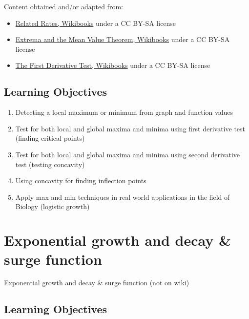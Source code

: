 Content obtained and/or adapted from:



\begin{itemize}
    \item \href{https://en.wikibooks.org/wiki/High_School_Calculus/Related_Rates}{Related Rates, Wikibooks} under a CC BY-SA license
    \item \href{https://en.wikibooks.org/wiki/High_School_Calculus/Extrema_and_the_Mean_Value_Theorem}{Extrema and the Mean Value Theorem, Wikibooks} under a CC BY-SA license
    \item \href{https://en.wikibooks.org/wiki/High_School_Calculus/The_First_Derivative_Test}{The First Derivative Test, Wikibooks} under a CC BY-SA license
\end{itemize}

\subsection{Learning Objectives}

\begin{enumerate}
    \item Detecting a local maximum or minimum from graph and function values
    \item Test for both local and global maxima and minima using first derivative test (finding critical points)
    \item Test for both local and global maxima and minima using second derivative test (testing concavity)
    \item Using concavity for finding inflection points
    \item Apply max and min techniques in real world applications in the field of Biology (logistic growth)
\end{enumerate}

\section{Exponential growth and decay \& surge function}
\label{sec:exponential-growth-and-decay-surge-function}

Exponential growth and decay \& surge function (not on wiki)

\subsection{Learning Objectives}

